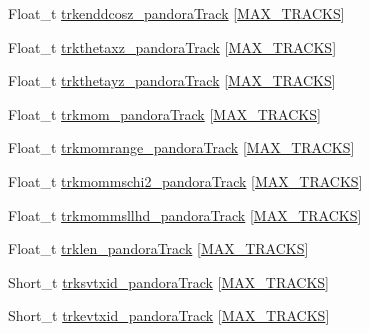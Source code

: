 \begin{DoxyCompactItemize}
\item 
Float\-\_\-t \hyperlink{classanatree_af6279aa8e9f6ec8c1f86bc3f0eadd309}{trkenddcosz\-\_\-pandora\-Track} \mbox{[}\hyperlink{anatree__core__v09410002__orig_8h_a327fd4e796e4a0d78947524c96e4362e}{M\-A\-X\-\_\-\-T\-R\-A\-C\-K\-S}\mbox{]}
\item 
Float\-\_\-t \hyperlink{classanatree_ad9f1e172e403a07751ea043eae09071a}{trkthetaxz\-\_\-pandora\-Track} \mbox{[}\hyperlink{anatree__core__v09410002__orig_8h_a327fd4e796e4a0d78947524c96e4362e}{M\-A\-X\-\_\-\-T\-R\-A\-C\-K\-S}\mbox{]}
\item 
Float\-\_\-t \hyperlink{classanatree_a3b69b754f03c24f4f95ff3588f4d1f16}{trkthetayz\-\_\-pandora\-Track} \mbox{[}\hyperlink{anatree__core__v09410002__orig_8h_a327fd4e796e4a0d78947524c96e4362e}{M\-A\-X\-\_\-\-T\-R\-A\-C\-K\-S}\mbox{]}
\item 
Float\-\_\-t \hyperlink{classanatree_a67a174c135adc7925291164837310d9a}{trkmom\-\_\-pandora\-Track} \mbox{[}\hyperlink{anatree__core__v09410002__orig_8h_a327fd4e796e4a0d78947524c96e4362e}{M\-A\-X\-\_\-\-T\-R\-A\-C\-K\-S}\mbox{]}
\item 
Float\-\_\-t \hyperlink{classanatree_a0005c24e7a511ee7cb4db899cd4df8d5}{trkmomrange\-\_\-pandora\-Track} \mbox{[}\hyperlink{anatree__core__v09410002__orig_8h_a327fd4e796e4a0d78947524c96e4362e}{M\-A\-X\-\_\-\-T\-R\-A\-C\-K\-S}\mbox{]}
\item 
Float\-\_\-t \hyperlink{classanatree_a73ccb0435dd251dc6c0ef9f98cb516b2}{trkmommschi2\-\_\-pandora\-Track} \mbox{[}\hyperlink{anatree__core__v09410002__orig_8h_a327fd4e796e4a0d78947524c96e4362e}{M\-A\-X\-\_\-\-T\-R\-A\-C\-K\-S}\mbox{]}
\item 
Float\-\_\-t \hyperlink{classanatree_a93bd3ed25f1c1f6db57d77edf391346c}{trkmommsllhd\-\_\-pandora\-Track} \mbox{[}\hyperlink{anatree__core__v09410002__orig_8h_a327fd4e796e4a0d78947524c96e4362e}{M\-A\-X\-\_\-\-T\-R\-A\-C\-K\-S}\mbox{]}
\item 
Float\-\_\-t \hyperlink{classanatree_acd1961cb842d4578a53ec76be72ed606}{trklen\-\_\-pandora\-Track} \mbox{[}\hyperlink{anatree__core__v09410002__orig_8h_a327fd4e796e4a0d78947524c96e4362e}{M\-A\-X\-\_\-\-T\-R\-A\-C\-K\-S}\mbox{]}
\item 
Short\-\_\-t \hyperlink{classanatree_a54239e76d4ff42ad1881942c5984527d}{trksvtxid\-\_\-pandora\-Track} \mbox{[}\hyperlink{anatree__core__v09410002__orig_8h_a327fd4e796e4a0d78947524c96e4362e}{M\-A\-X\-\_\-\-T\-R\-A\-C\-K\-S}\mbox{]}
\item 
Short\-\_\-t \hyperlink{classanatree_af9d547ab61ed895f06eadddf3f5b1a48}{trkevtxid\-\_\-pandora\-Track} \mbox{[}\hyperlink{anatree__core__v09410002__orig_8h_a327fd4e796e4a0d78947524c96e4362e}{M\-A\-X\-\_\-\-T\-R\-A\-C\-K\-S}\mbox{]}

\end{DoxyCompactItemize}
